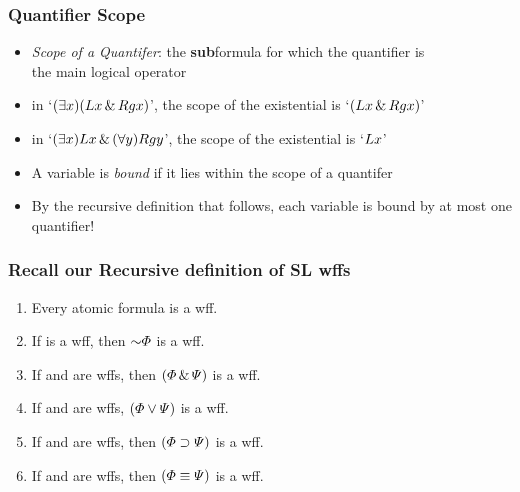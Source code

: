 \begin{frame}
\frametitle{Quantifier Scope}

\begin{itemize}[<+->]

\item \emph{Scope of a Quantifer}: the \textbf{sub}formula for which the quantifier is \\  the main logical operator 

\item[] in `$(\exists x)(Lx \,\&\, Rgx)$', the scope of the existential is `\alert{$(Lx \,\&\, Rgx)$}'

\item[] in `$(\exists x)Lx \,\&\, (\forall y)Rgy$', the scope of the existential is `\alert{$Lx$}'

\item A variable is \emph{bound} if it lies within the scope of a quantifer

\item By the recursive definition that follows, each variable is bound by at most one quantifier!

\end{itemize}
\end{frame}

\begin{frame}
\frametitle{Recall our Recursive definition of SL wffs}

\begin{enumerate}[<+->]

\item Every atomic formula is a wff.
\item If \metaA{} is a wff, then $\enot\metaA{}$ is a wff.
\item If \metaA{} and \metaB{} are wffs, then $(\varPhi{}\,\&\,\varPsi{})$ is a wff.
\item If \metaA{} and \metaB{} are wffs, $(\varPhi{}\vee\varPsi{})$ is a wff.
\item If \metaA{} and \metaB{} are wffs, then $(\varPhi{}\supset\varPsi{})$ is a wff.
\item If \metaA{} and \metaB{} are wffs, then $(\varPhi{}\equiv\varPsi{})$ is a wff.

\end{enumerate}


\end{frame}

